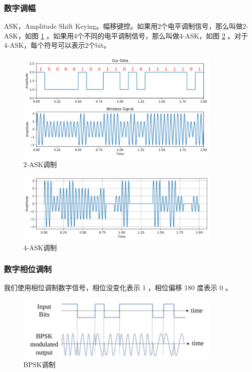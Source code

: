 \documentclass[lang=cn,newtx,10pt,scheme=chinese]{elegantbook}
\begin{document}
\subsubsection{数字调幅}

ASK，Amplitude Shift Keying。幅移键控。如果用2个电平调制信号，那么叫做2-ASK，如图 \ref{fig:2-ASK} 。如果用4个不同的电平调制信号，那么叫做4-ASK，如图 \ref{fig:4-ASK} 。对于 4-ASK，每个符号可以表示2个bit。

\begin{figure}[!htb]
\centering
\includegraphics[width=0.9\textwidth]{ASK.pdf}
\caption{2-ASK调制}
\label{fig:2-ASK}
\end{figure}

\begin{figure}[!htb]
\centering
\includegraphics[width=0.9\textwidth]{ask2.pdf}
\caption{4-ASK调制}
\label{fig:4-ASK}
\end{figure}

\subsubsection{数字相位调制}

我们使用相位调制数字信号，相位没变化表示 1 ，相位偏移 180 度表示 0 。

\begin{figure}[!htb]
\centering
\includegraphics[width=0.9\textwidth]{bpsk.pdf}
\caption{BPSK调制}
\label{fig:BPSK}
\end{figure}
\end{document}
